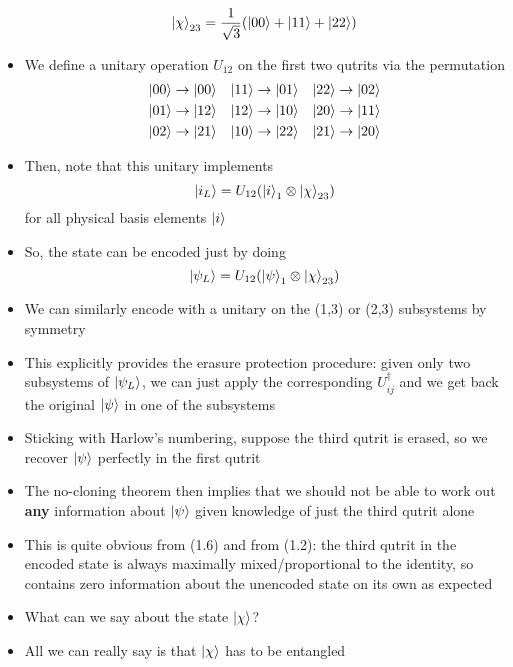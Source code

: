 \documentclass[12pt,a4paper]{article}
\numberwithin{equation}{section}
\begin{document}
\begin{itemize}
		\begin{equation}
			\ket{\chi}_{23}=\frac{1}{\sqrt{3}}(\ket{00}+\ket{11}+\ket{22})
		\end{equation}
		\item We define a unitary operation $U_{12}$ on the first two qutrits via the permutation
		\begin{equation}
			\begin{aligned}
				\ket{00}&\to\ket{00} & \ket{11}&\to\ket{01} & \ket{22}&\to\ket{02}\\
				\ket{01}&\to\ket{12} & \ket{12}&\to\ket{10} & \ket{20}&\to\ket{11}\\
				\ket{02}&\to\ket{21} & \ket{10}&\to\ket{22} & \ket{21}&\to\ket{20}
			\end{aligned}
		\end{equation}
		\item Then, note that this unitary implements
		\begin{equation}
			\ket{i_{L}}=U_{12}(\ket{i}_{1}\otimes\ket{\chi}_{23})
		\end{equation}
		for all physical basis elements $\ket{i}$
		\item So, the state can be encoded just by doing
		\begin{equation}
			\ket{\psi_{L}}=U_{12}(\ket{\psi}_{1}\otimes\ket{\chi}_{23})
		\end{equation}
		\item We can similarly encode with a unitary on the (1,3) or (2,3) subsystems by symmetry
		\item This explicitly provides the erasure protection procedure: given only two subsystems of $\ket{\psi_{L}}$, we can just apply the corresponding $U_{ij}^{\dagger}$ and we get back the original $\ket{\psi}$ in one of the subsystems
		\item Sticking with Harlow's numbering, suppose the third qutrit is erased, so we recover $\ket{\psi}$ perfectly in the first qutrit
		\item The no-cloning theorem then implies that we should not be able to work out \textbf{any} information about $\ket{\psi}$ given knowledge of just the third qutrit alone
		\item This is quite obvious from (1.6) and from (1.2): the third qutrit in the encoded state is always maximally mixed/proportional to the identity, so contains zero information about the unencoded state on its own as expected
		\item What can we say about the state $\ket{\chi}$?
		\item All we can really say is that $\ket{\chi}$ has to be entangled

\end{itemize}
\end{document}
